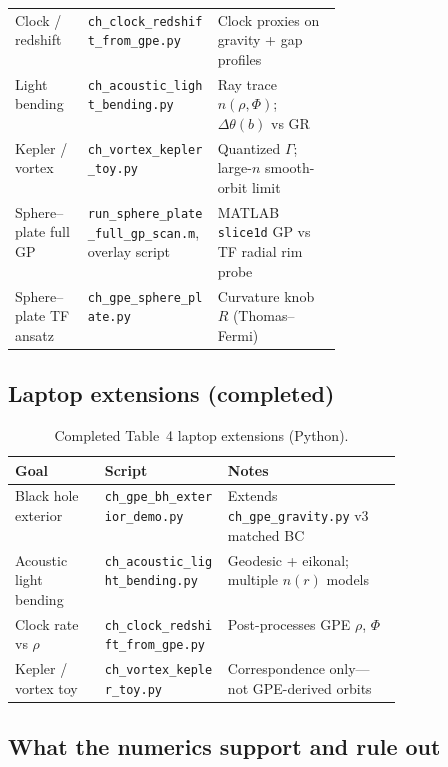 \documentclass[11pt,a4paper]{article}
\begin{document}
\begin{table}[htbp]
\begin{tabular}{@{}llp{0.38\linewidth}@{}}
    Clock / redshift & \texttt{ch\_clock\_redshift\_from\_gpe.py} & Clock proxies on gravity + gap profiles \\
    Light bending & \texttt{ch\_acoustic\_light\_bending.py} & Ray trace $n(\rho,\Phi)$; $\Delta\theta(b)$ vs GR \\
    Kepler / vortex & \texttt{ch\_vortex\_kepler\_toy.py} & Quantized $\Gamma$; large-$n$ smooth-orbit limit \\
    Sphere--plate full GP & \texttt{run\_sphere\_plate\_full\_gp\_scan.m}, overlay script & MATLAB \texttt{slice1d} GP vs TF radial rim probe \\
    Sphere--plate TF ansatz & \texttt{ch\_gpe\_sphere\_plate.py} & Curvature knob $R$ (Thomas--Fermi) \\
    \bottomrule
  \end{tabular}
\end{table}

\subsection{Laptop extensions (completed)}
\label{sec:sim-completed}

\begin{table}[htbp]
  \centering
  \footnotesize
  \caption{Completed Table~4 laptop extensions (Python).}
  \begin{tabular}{@{}llp{0.45\linewidth}@{}}
    \toprule
    Goal & Script & Notes \\
    \midrule
    Black hole exterior & \texttt{ch\_gpe\_bh\_exterior\_demo.py} & Extends \texttt{ch\_gpe\_gravity.py} v3 matched BC \\
    Acoustic light bending & \texttt{ch\_acoustic\_light\_bending.py} & Geodesic + eikonal; multiple $n(r)$ models \\
    Clock rate vs $\rho$ & \texttt{ch\_clock\_redshift\_from\_gpe.py} & Post-processes GPE $\rho$, $\Phi$ \\
    Kepler / vortex toy & \texttt{ch\_vortex\_kepler\_toy.py} & Correspondence only---not GPE-derived orbits \\
    \bottomrule
  \end{tabular}
\end{table}

\subsection{What the numerics support and rule out}
\label{sec:numerics-summary}
\end{document}
